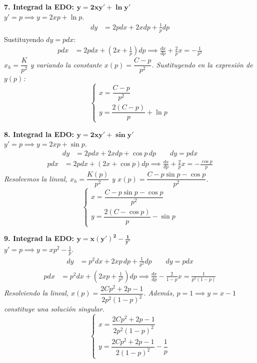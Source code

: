 \documentclass[11pt, a4paper]{article}
\begin{document}
\noindent\textbf{7. Integrad la EDO: $\bm{y = 2xy' + \ln y'}$} \\
$y' = p \implies y = 2xp + \ln p$.
\begin{align*}
dy &= 2p dx + 2xdp + \frac{1}{p}dp
\end{align*}
Sustituyendo $dy = pdx$:
\begin{align*}
p dx &= 2p dx + \left(2x + \frac{1}{p}\right)dp \implies \frac{dx}{dp} + \frac{2}{p}x = -\frac{1}{p^2}
\end{align*}
\textit{$x_h = \dfrac{K}{p^2}$ y variando la constante $x(p) = \dfrac{C-p}{p^2}$. Sustituyendo en la expresión de $y(p)$:}
\[
\boxed{\begin{cases} x = \dfrac{C-p}{p^2} \\[2ex] y = \dfrac{2(C-p)}{p} + \ln p \end{cases}}
\]


\noindent\textbf{8. Integrad la EDO: $\bm{y = 2xy' + \sin y'}$} \\
$y' = p \implies y = 2xp + \sin p$.
\begin{align*}
dy &= 2p dx + 2xdp + \cos p \, dp \qquad dy = pdx 
\end{align*}
\begin{align*}
p dx &= 2p dx + (2x + \cos p)dp \implies \frac{dx}{dp} + \frac{2}{p}x = -\frac{\cos p}{p}
\end{align*}
\textit{Resolvemos la lineal, $x_h = \dfrac{K(p)}{p^2}$ y $x(p) = \dfrac{C - p\sin p - \cos p}{p^2}$.}
\[
\boxed{\begin{cases} x = \dfrac{C - p\sin p - \cos p}{p^2} \\[2ex] y = \dfrac{2(C - \cos p)}{p} - \sin p \end{cases}}
\]


\noindent\textbf{9. Integrad la EDO: $\bm{y = x(y')^2 - \frac{1}{y'}}$} \\
$y' = p \implies y = xp^2 - \frac{1}{p}$.
\begin{align*}
dy &= p^2 dx + 2xp \, dp + \frac{1}{p^2}dp \qquad dy=pdx
\end{align*}
\begin{align*}
p dx &= p^2 dx + \left(2xp + \frac{1}{p^2}\right)dp \implies \frac{dx}{dp} - \frac{2}{1-p}x = \frac{1}{p^3(1-p)}
\end{align*}
\textit{Resolviendo la lineal, $x(p) = \dfrac{2Cp^2 + 2p - 1}{2p^2(1-p)^2}$. Además, $p=1 \implies y = x-1$ constituye una solución singular.}
\[
\boxed{\begin{cases} x = \dfrac{2Cp^2 + 2p - 1}{2p^2(1-p)^2} \\[2ex] y = \dfrac{2Cp^2 + 2p - 1}{2(1-p)^2} - \dfrac{1}{p} \end{cases}}
\]
\end{document}
